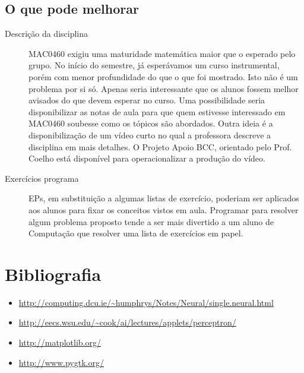 \documentclass[brazil, a4paper]{article}
\begin{document}
\subsection{O que pode melhorar}
\begin{description}

	\item[Descrição da disciplina] MAC0460 exigiu uma maturidade matemática maior
	que o esperado pelo grupo. No início do semestre, já esperávamos um curso
	instrumental, porém com menor profundidade do que o que foi mostrado. Isto
	não é um problema por si só. Apenas seria interessante que os alunos fossem
	melhor avisados do que devem esperar no curso. Uma possibilidade seria
	disponibilizar as notas de aula para que quem estivesse interessado em
	MAC0460 soubesse como os tópicos são abordados. Outra ideia é a
	disponibilização de um vídeo curto no qual a professora descreve a
	disciplina em mais detalhes. O Projeto Apoio BCC, orientado pelo Prof.
	Coelho está disponível para operacionalizar a produção do vídeo.

	\item[Exercícios programa] EPs, em substituição a algumas listas de exercício,
	poderiam ser aplicados aos alunos para fixar os conceitos vistos em aula.
	Programar para resolver algum problema proposto tende a ser mais divertido a
	um aluno de Computação que resolver uma lista de exercícios em papel.

\end{description}


\section{Bibliografia}
\begin{itemize}
\item \url{http://computing.dcu.ie/~humphrys/Notes/Neural/single.neural.html}
\item \url{http://eecs.wsu.edu/~cook/ai/lectures/applets/perceptron/}
\item \url{http://matplotlib.org/}
\item \url{http://www.pygtk.org/}
\end{itemize}
\end{document}

